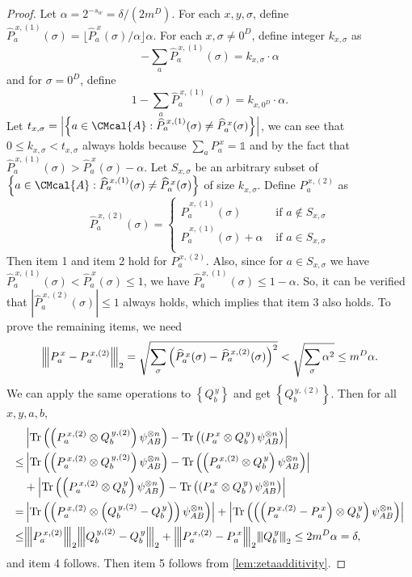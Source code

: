 \documentclass[10pt,a4paper]{article}
\def\A{\CMcal{A}}
\theoremstyle{plain}
\theoremstyle{definition}
\newcommand {\set} [1] {\ensuremath{ \left\lbrace #1 \right\rbrace }}
\newcommand {\br} [1] {\ensuremath{ \left( #1 \right) }}
\newcommand {\ab} [1] {\ensuremath{ \left| #1 \right| }}
\newcommand{\nnorm}[1]{{\left\vert\kern-0.25ex\left\vert\kern-0.25ex\left\vert #1
		\right\vert\kern-0.25ex\right\vert\kern-0.25ex\right\vert}}
\newcommand {\Tr} {\ensuremath{ \mathrm{Tr} }}
\newcommand {\id} {\ensuremath{\mathds{1}}}
\newcommand{\dlbo} {\ensuremath{{D}}}
\newcommand{\wireal} {\ensuremath{{s_{w}}}}
\newcommand{\Pss} {\ensuremath{P^{\,x}_a}}
\newcommand{\Qss} {\ensuremath{Q^{\,y}_b}}
\newcommand{\Pnn}[1] {\ensuremath{{P^{\,x, (#1)}_a}}}
\newcommand{\Qnn}[1] {\ensuremath{{Q^{\,y, (#1)}_b}}}
\newcommand{\Pff} {\ensuremath{\widehat{P}^{\,x}_a(\sigma)}}
\newcommand{\Pfn}[1] {\ensuremath{{{\widehat{P}}^{\,x, {(#1)}}_a}(\sigma)}}
\newcommand{\1}{\mathbb{1}} %
\begin{document}
\begin{proof}
    \newcommand{\tsms} {\alpha}
    Let $\tsms=2^{-\wireal}=\delta/(2m^D)$.
    For each $x, y, \sigma$, define $\Pfn{1} = \lfloor\Pff/\tsms\rfloor\tsms$.
    For each $x, \sigma\neq0^\dlbo$, define integer $k_{x, \sigma}$ as
    $$-\sum_{a}\Pfn{1} = k_{x, \sigma}\cdot\tsms$$
    and for $\sigma=0^D$, define
    $$1 - \sum_{a}\Pfn{1} = k_{x, 0^\dlbo}\cdot\tsms.$$
    Let $t_{x,\sigma}=\ab{\set{a\in\A: \Pfn{1}\neq \Pff}}$,
    we can see that $0\le k_{x, \sigma}< t_{x,\sigma}$ always holds because
    $\sum_{a}\Pss=\id$
    and by the fact that $\Pfn{1}>\Pff-\alpha$.
    Let $S_{x, \sigma}$ be an arbitrary subset of $\set{a\in\A: \Pfn{1}\neq \Pff}$ of size $k_{x,\sigma}$.
    Define $\Pnn{2}$ as
    $$\Pfn{2}=\begin{cases}
        \Pfn{1} &\text{ if } a \not\in S_{x,\sigma} \\
        \Pfn{1} + \tsms&\text{ if } a \in S_{x,\sigma} \\
    \end{cases}$$
    Then item 1 and item 2 hold for $\Pnn{2}$.
    Also, since for $a\in S_{x,\sigma}$ we have $\Pfn{1}< \Pff\le 1$, we have $\Pfn{1}\le1-\alpha$.
    So, it can be verified that $\ab{\Pfn{2}}\le1$ always holds, which implies that item 3 also holds.
    To prove the remaining items, we need
    $$\nnorm{\Pss-\Pnn{2}}_2 = \sqrt{\sum_{\sigma}\br{\Pff-\Pfn{2}}^2}
                                   <\sqrt{\sum_{\sigma}\tsms^2}\le m^D\tsms.$$
    We can apply the same operations to $\set{\Qss}$ and get $\set{\Qnn{2}}$.
    Then for all $x, y, a, b$,
    \begin{align*}
     &\ab{\Tr\br{\br{\Pnn{2}\otimes \Qnn{2}}\psi^{\otimes n}_{AB}}-\Tr\br{\br{\Pss\otimes \Qss}\psi^{\otimes n}_{AB}}} \\
  \le&\ab{\Tr\br{\br{\Pnn{2}\otimes \Qnn{2}}\psi^{\otimes n}_{AB}}-\Tr\br{\br{\Pnn{2}\otimes \Qss}\psi^{\otimes n}_{AB}}}\\ 
    &+\ab{\Tr\br{\br{\Pnn{2}\otimes \Qss}\psi^{\otimes n}_{AB}}-\Tr\br{\br{\Pss\otimes \Qss}\psi^{\otimes n}_{AB}}} \\
    =&\ab{\Tr\br{\br{\Pnn{2}\otimes \br{\Qnn{2}-\Qss}}\psi^{\otimes n}_{AB}}} +
      \ab{\Tr\br{\br{\br{\Pnn{2}-\Pss}\otimes \Qss}\psi^{\otimes n}_{AB}}} \\
 \leq&\nnorm{\Pnn{2}}_2\nnorm{\Qnn{2}-\Qss}_2 + \nnorm{\Pnn{2}-\Pss}_2\nnorm{\Qss}_2
 \leq2m^D\tsms=\delta,
    \end{align*}
    and item 4 follows.
    Then item 5 follows from \cref{lem:zetaadditivity}.
\end{proof}
\end{document}
